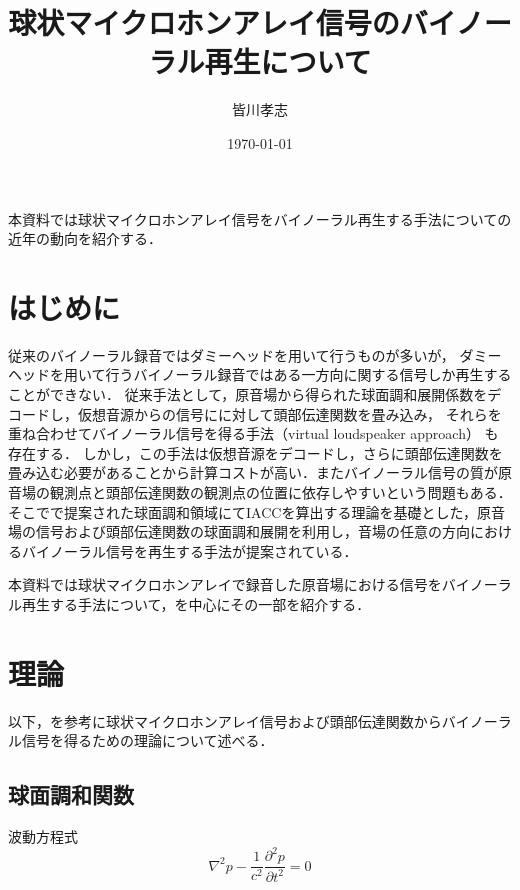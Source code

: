 \documentclass[a4paper]{jsarticle}
\begin{document}
\title{球状マイクロホンアレイ信号のバイノーラル再生について}
\author{皆川孝志}
\date{\today}
\maketitle

本資料では球状マイクロホンアレイ信号をバイノーラル再生する手法についての近年の動向を紹介する．

\section{はじめに}
従来のバイノーラル録音ではダミーヘッドを用いて行うものが多いが，
ダミーヘッドを用いて行うバイノーラル録音ではある一方向に関する信号しか再生することができない\cite{Andersson_undated-qg}．
従来手法として，原音場から得られた球面調和展開係数をデコードし，仮想音源からの信号にに対して頭部伝達関数を畳み込み，
それらを重ね合わせてバイノーラル信号を得る手法\cite{Jot1999-bt, Noisternig2003-ug}（virtual loudspeaker approach）
も存在する．
しかし，この手法は仮想音源をデコードし，さらに頭部伝達関数を畳み込む必要があることから計算コストが高い．またバイノーラル信号の質が原音場の観測点と頭部伝達関数の観測点の位置に依存しやすいという問題もある．
そこで\cite{Rafaely2010-ea}で提案された球面調和領域にてIACCを算出する理論を基礎とした，原音場の信号および頭部伝達関数の球面調和展開を利用し，音場の任意の方向におけるバイノーラル信号を再生する手法が提案されている\cite{Andersson_undated-qg,Bernschutz2016-be,Otani2020-cg,Schorkhuber2018-ql, Sheaffer2014-bo, Zaunschirm2018-mn}．

本資料では球状マイクロホンアレイで録音した原音場における信号をバイノーラル再生する手法について，\cite{Andersson_undated-qg}を中心にその一部を紹介する．

\section{理論}
以下，\cite{Andersson_undated-qg}を参考に球状マイクロホンアレイ信号および頭部伝達関数からバイノーラル信号を得るための理論について述べる．

\subsection{球面調和関数}
波動方程式
\begin{equation}
    \label{wave-equation}
    \nabla^{2} p-\frac{1}{c^{2}} \frac{\partial^{2} p}{\partial t^{2}}=0
\end{equation}
\end{document}
